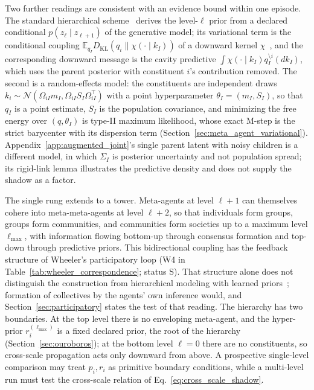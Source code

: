 Two further readings are consistent with an evidence bound within one episode. The standard hierarchical scheme~\cite{friston2008hierarchical, parr2022active} derives the level-$\ell$ prior from a declared conditional $p(z_\ell \mid z_{\ell+1})$ of the generative model; its variational term is the conditional coupling $\mathbb{E}_{q_I} D_{\mathrm{KL}}(q_i \| \chi(\cdot \mid k_I))$ of a downward kernel $\chi$~\cite[Ch.~12]{DennisGaugeVFE2026}, and the corresponding downward message is the cavity predictive $\int \chi(\cdot \mid k_I) q_I^{\setminus i}(dk_I)$, which uses the parent posterior with constituent $i$'s contribution removed. The second is a random-effects model: the constituents are independent draws $k_i \sim \mathcal{N}(\Omega_{iI} m_I, \Omega_{iI} S_I \Omega_{iI}^\top)$ with a point hyperparameter $\theta_I = (m_I, S_I)$, so that $q_I$ is a point estimate, $S_I$ is the population covariance, and minimizing the free energy over $(q, \theta_I)$ is type-II maximum likelihood, whose exact M-step is the strict barycenter with its dispersion term (Section~\ref{sec:meta_agent_variational}). Appendix~\ref{app:augmented_joint}'s single parent latent with noisy children is a different model, in which $\Sigma_I$ is posterior uncertainty and not population spread; its rigid-link lemma illustrates the predictive density and does not supply the shadow as a factor.

The single rung extends to a tower. Meta-agents at level $\ell+1$ can themselves cohere into meta-meta-agents at level $\ell+2$, so that individuals form groups, groups form communities, and communities form societies up to a maximum level $\ell_{\max}$, with information flowing bottom-up through consensus formation and top-down through predictive priors. This bidirectional coupling has the feedback structure of Wheeler's participatory loop (W4 in Table~\ref{tab:wheeler_correspondence}; status S). That structure alone does not distinguish the construction from hierarchical modeling with learned priors~\cite[Ch.~14]{DennisGaugeVFE2026}; formation of collectives by the agents' own inference would, and Section~\ref{sec:participatory} states the test of that reading. The hierarchy has two boundaries. At the top level there is no enveloping meta-agent, and the hyper-prior $r_i^{(\ell_{\max})}$ is a fixed declared prior, the root of the hierarchy (Section~\ref{sec:ouroboros}); at the bottom level $\ell = 0$ there are no constituents, so cross-scale propagation acts only downward from above. A prospective single-level comparison may treat $p_i, r_i$ as primitive boundary conditions, while a multi-level run must test the cross-scale relation of Eq.~\eqref{eq:cross_scale_shadow}.

